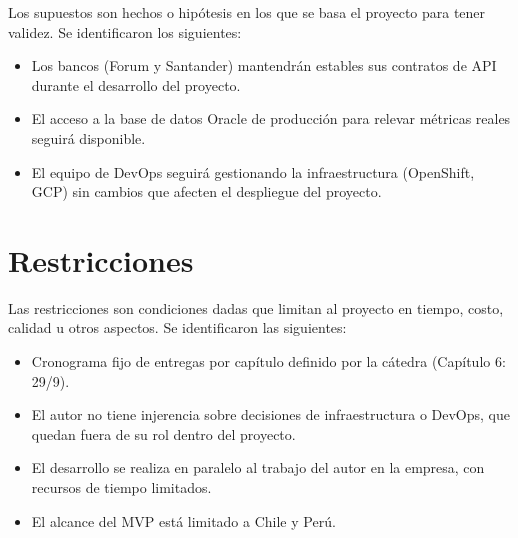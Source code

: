 Los supuestos son hechos o hipótesis en los que se basa el proyecto para tener validez. Se identificaron los siguientes:

\begin{itemize}
\item Los bancos (Forum y Santander) mantendrán estables sus contratos de API durante el desarrollo del proyecto.
\item El acceso a la base de datos Oracle de producción para relevar métricas reales seguirá disponible.
\item El equipo de DevOps seguirá gestionando la infraestructura (OpenShift, GCP) sin cambios que afecten el despliegue del proyecto.
\end{itemize}
\section{Restricciones}

Las restricciones son condiciones dadas que limitan al proyecto en tiempo, costo, calidad u otros aspectos. Se identificaron las siguientes:

\begin{itemize}
\item Cronograma fijo de entregas por capítulo definido por la cátedra (Capítulo 6: 29/9).
\item El autor no tiene injerencia sobre decisiones de infraestructura o DevOps, que quedan fuera de su rol dentro del proyecto.
\item El desarrollo se realiza en paralelo al trabajo del autor en la empresa, con recursos de tiempo limitados.
\item El alcance del MVP está limitado a Chile y Perú.
\end{itemize}
